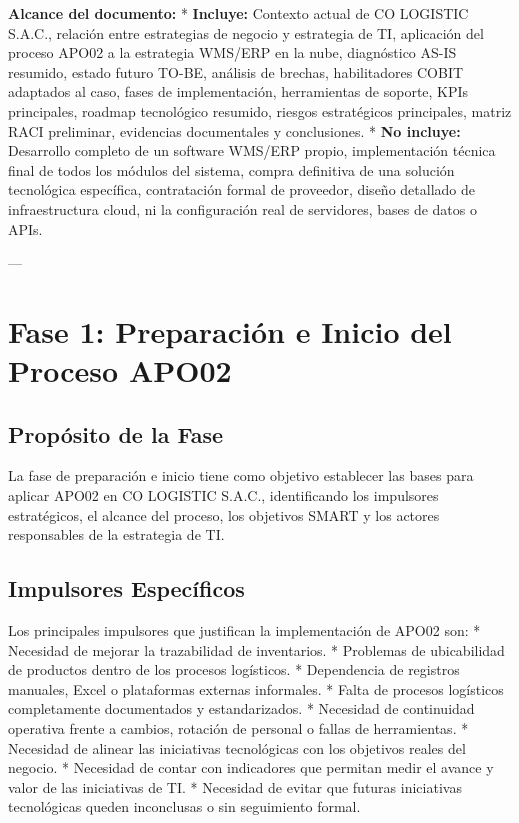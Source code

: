 \documentclass[11pt]{article}
\begin{document}
\textbf{Alcance del documento:}
* \textbf{Incluye:} Contexto actual de CO LOGISTIC S.A.C., relación entre estrategias de negocio y estrategia de TI, aplicación del proceso APO02 a la estrategia WMS/ERP en la nube, diagnóstico AS-IS resumido, estado futuro TO-BE, análisis de brechas, habilitadores COBIT adaptados al caso, fases de implementación, herramientas de soporte, KPIs principales, roadmap tecnológico resumido, riesgos estratégicos principales, matriz RACI preliminar, evidencias documentales y conclusiones.
* \textbf{No incluye:} Desarrollo completo de un software WMS/ERP propio, implementación técnica final de todos los módulos del sistema, compra definitiva de una solución tecnológica específica, contratación formal de proveedor, diseño detallado de infraestructura cloud, ni la configuración real de servidores, bases de datos o APIs.

---

\section{Fase 1: Preparación e Inicio del Proceso APO02}

\subsection{Propósito de la Fase}
La fase de preparación e inicio tiene como objetivo establecer las bases para aplicar APO02 en CO LOGISTIC S.A.C., identificando los impulsores estratégicos, el alcance del proceso, los objetivos SMART y los actores responsables de la estrategia de TI.

\subsection{Impulsores Específicos}
Los principales impulsores que justifican la implementación de APO02 son:
* Necesidad de mejorar la trazabilidad de inventarios.
* Problemas de ubicabilidad de productos dentro de los procesos logísticos.
* Dependencia de registros manuales, Excel o plataformas externas informales.
* Falta de procesos logísticos completamente documentados y estandarizados.
* Necesidad de continuidad operativa frente a cambios, rotación de personal o fallas de herramientas.
* Necesidad de alinear las iniciativas tecnológicas con los objetivos reales del negocio.
* Necesidad de contar con indicadores que permitan medir el avance y valor de las iniciativas de TI.
* Necesidad de evitar que futuras iniciativas tecnológicas queden inconclusas o sin seguimiento formal.
\end{document}
